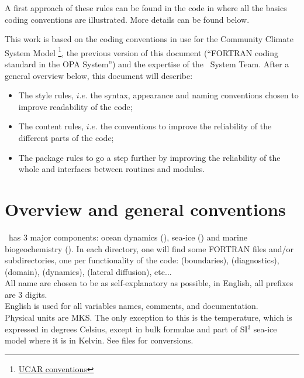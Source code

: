 A first approach of these rules can be found in the code in  where
all the basics coding conventions are illustrated.
More details can be found below.

This work is based on the coding conventions in use for the Community Climate System Model
\footnote {\href{http://www.cesm.ucar.edu/working_groups/Software/dev_guide/dev_guide/node7.html}{UCAR conventions}},
the previous version of this document (``FORTRAN coding standard in the OPA System'') and
the expertise of the \NEMO\ System Team.
After a general overview below, this document will describe:

\begin{itemize}
\item The style rules, $i.e.$ the syntax, appearance and naming conventions chosen to improve readability of the code;
\item The content rules, $i.e.$ the conventions to improve the reliability of the different parts of the code;
\item The package rules to go a step further by improving the reliability of the whole and
	interfaces between routines and modules.
\end{itemize}

\section{Overview and general conventions}

\NEMO\ has 3 major components: ocean dynamics (), sea-ice () and
marine biogeochemistry ().
In each directory, one will find some FORTRAN files and/or subdirectories, one per functionality of the code:
 (boundaries),  (diagnostics),  (domain),
 (dynamics),  (lateral diffusion), etc... \\
All name are chosen to be as self-explanatory as possible, in English, all prefixes are 3 digits. \\
English is used for all variables names, comments, and documentation. \\
Physical units are MKS. The only exception to this is the temperature, which is expressed in degrees Celsius,
except in bulk formulae and part of SI$^3$ sea-ice model where it is in Kelvin.
See  files for conversions.

